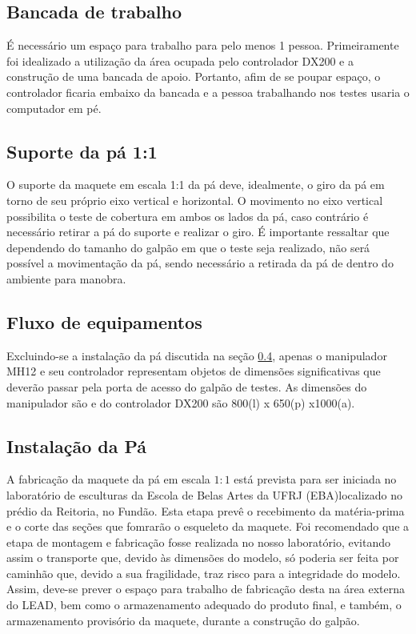\subsection{Bancada de trabalho}
É necessário um espaço para trabalho para pelo menos 1 pessoa.
Primeiramente foi idealizado a utilização da área ocupada pelo controlador DX200
e a construção de uma bancada de apoio. 
Portanto, afim de se poupar espaço, o
controlador ficaria embaixo da bancada e a pessoa trabalhando nos testes usaria
o computador em pé.

 \subsection{Suporte da pá 1:1}
 O suporte da maquete em escala 1:1 da pá deve, idealmente, o giro da pá em
 torno de seu próprio eixo vertical e horizontal. 
 O movimento no eixo vertical possibilita o teste de cobertura em ambos os lados
 da pá, caso contrário é necessário retirar a pá do suporte e realizar o giro.
 É importante ressaltar que dependendo do tamanho do galpão em que o teste seja
 realizado, não será possível a movimentação da pá, sendo necessário a retirada
 da pá de dentro do ambiente para manobra.
 
 \subsection{Fluxo de equipamentos}
 Excluindo-se a instalação da pá discutida na seção \ref{sec::instal_pa}, apenas
o manipulador MH12 e seu controlador representam objetos de dimensões
significativas que deverão passar pela porta de acesso do galpão de testes.
As dimensões do manipulador são e do controlador DX200 são 800(l)   x  650(p) 
x1000(a). 


\subsection{Instalação da Pá}\label{sec::instal_pa}

A fabricação da maquete da pá em escala $1:1$ está prevista para ser iniciada no
laboratório de esculturas da Escola de Belas Artes da UFRJ (EBA)localizado no
prédio da Reitoria, no Fundão.
Esta etapa prevê o recebimento da matéria-prima e o corte das seções que
fomrarão o esqueleto da maquete. 
Foi recomendado que a etapa de montagem e fabricação fosse realizada no nosso
laboratório, evitando assim o transporte que, devido às dimensões do modelo,  só
poderia ser feita por caminhão que, devido a sua fragilidade, traz risco para a
integridade do modelo.
Assim, deve-se prever o espaço para trabalho de fabricação desta na área externa
do LEAD, bem como o armazenamento adequado do produto final, e também, o
armazenamento provisório da maquete, durante a construção do galpão.

